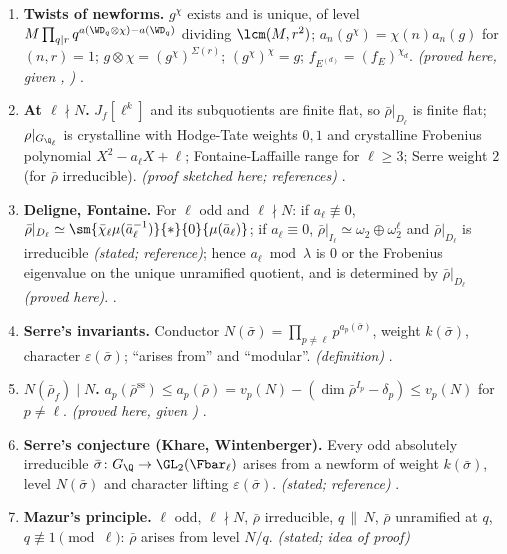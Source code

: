\begin{enumerate}[label=\textbf{\thechapter.\arabic*}]
{)} .
\item \textbf{Twists of newforms.} $g^\chi$ exists and is unique, of level $M\prod_{q\mid r}q^{a(\WD_q\otimes\chi)-a(\WD_q)}$ dividing $\lcm(M,r^2)$; $a_n(g^\chi)=\chi(n)a_n(g)$ for $(n,r)=1$;
$g\otimes\chi=(g^\chi)^{\Sigma(r)}$; $(g^\chi)^\chi=g$; $f_{E^{(d)}}=(f_E)^{\chi_d}$. \emph{(proved here, given , )} .
\item \textbf{At $\ell\nmid N$.} $J_f[\ell^k]$ and its subquotients are finite flat, so $\bar\rho|_{D_\ell}$ is finite flat; $\rho|_{G_{\Q_\ell}}$ is crystalline with Hodge-Tate weights $0,1$ and
crystalline Frobenius polynomial $X^2-a_\ell X+\ell$; Fontaine-Laffaille range for $\ell\ge3$; Serre weight $2$ (for $\bar\rho$ irreducible). \emph{(proof sketched here; references)} .
\item \textbf{Deligne, Fontaine.} For $\ell$ odd and $\ell\nmid N$: if $a_\ell\not\equiv0$, $\bar\rho|_{D_\ell}\simeq\sm{\bar\chi_\ell\mu(\bar a_\ell^{-1})}{*}{0}{\mu(\bar a_\ell)}$; if $a_\ell\equiv0$, $\bar\rho|_{I_\ell}\simeq\omega_2\oplus\omega_2^\ell$ and $\bar\rho|_{D_\ell}$
is irreducible \emph{(stated; reference)}; hence $a_\ell\bmod\lambda$ is $0$ or the Frobenius eigenvalue on the unique unramified quotient, and is determined by $\bar\rho|_{D_\ell}$
\emph{(proved here)}. .
\item \textbf{Serre's invariants.} Conductor $N(\bar\sigma)=\prod_{p\ne\ell}p^{a_p(\bar\sigma)}$, weight $k(\bar\sigma)$, character $\varepsilon(\bar\sigma)$; ``arises from'' and ``modular''. \emph{(definition)}
.
\item \textbf{$N(\bar\rho_f)\mid N$.} $a_p(\bar\rho^{\mathrm{ss}})\le a_p(\bar\rho)=v_p(N)-(\dim\bar\rho^{I_p}-\delta_p)\le v_p(N)$ for $p\ne\ell$. \emph{(proved here, given )}
.
\item \textbf{Serre's conjecture (Khare, Wintenberger).} Every odd absolutely irreducible $\bar\sigma\colon G_\Q\to\GL_2(\Fbar_\ell)$ arises from a newform of weight $k(\bar\sigma)$, level $N(\bar\sigma)$ and
character lifting $\varepsilon(\bar\sigma)$. \emph{(stated; reference)} .
\item \textbf{Mazur's principle.} $\ell$ odd, $\ell\nmid N$, $\bar\rho$ irreducible, $q\,\|\,N$, $\bar\rho$ unramified at $q$, $q\not\equiv1\pmod\ell$: $\bar\rho$ arises from level $N/q$. \emph{(stated; idea of proof)}

\end{enumerate}

